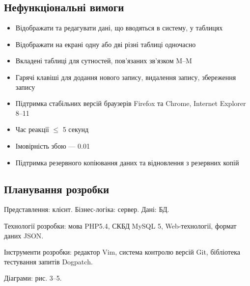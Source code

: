 \subsection{Нефункціональні вимоги}
\bigbreak
\begin{itemize}
 \item Відображати та редагувати дані, що вводяться в систему, у таблицях
 \item Відображати на екрані одну або дві різні таблиці одночасно
 \item Вкладені таблиці для сутностей, пов'язаних зв'язком M--M
 \item Гарячі клавіші для додання нового запису, видалення запису, збереження запису
 \item Підтримка стабільних версій браузерів Firefox та Chrome, Internet Explorer 8--11
 \item Час реакції $\leqslant$ 5 секунд
 \item Імовірність збою --- 0.01
 \item Підтримка резервного копіювання даних та відновлення з резервних копій
\end{itemize}
\bigbreak
\subsection{Планування розробки}
\bigbreak
Представлення: клієнт. Бізнес-логіка: сервер. Дані: БД.

Технології розробки: мова PHP5.4, СКБД MySQL 5, Web-технології, формат даних JSON.

Інструменти розробки: редактор Vim, система контролю версій Git, бібліотека тестування запитів Dogpatch.

Діаграми: рис. 3--5.

